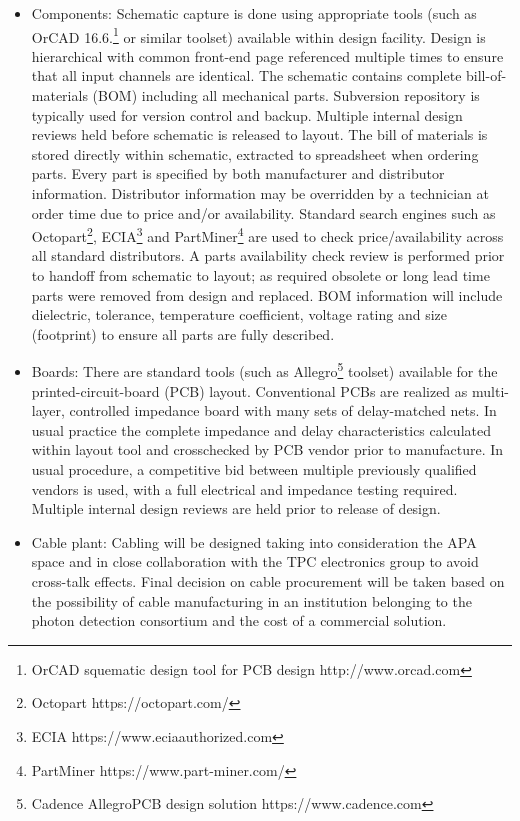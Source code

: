\begin{itemize}

\item Components: Schematic capture is done using appropriate tools (such as OrCAD 16.6.\footnote{OrCAD\texttrademark{} squematic design tool for PCB design http://www.orcad.com} or similar toolset) available within design facility. Design is hierarchical with common front-end page referenced multiple times to ensure that all input channels are identical. The schematic contains complete bill-of-materials (BOM) including all mechanical parts. Subversion repository is typically used for version control and backup. Multiple internal design reviews held before schematic is released to layout. The bill of materials is stored directly within schematic, extracted to spreadsheet when ordering parts. Every part is specified by both manufacturer and distributor information. Distributor information may be overridden by a technician at order time due to price and/or availability. Standard search engines such as Octopart\footnote{Octopart https://octopart.com/}, ECIA\footnote{ ECIA https://www.eciaauthorized.com} and PartMiner\footnote{PartMiner https://www.part-miner.com/} are used to check price/availability across all standard distributors. A parts availability check review is performed prior to handoff from schematic to layout; as required obsolete or long lead time parts were removed from design and replaced. BOM information will include dielectric, tolerance, temperature coefficient, voltage rating and size (footprint) to ensure all parts are fully described.

\item Boards: There are standard tools (such as Allegro\footnote{Cadence Allegro\textregistered PCB design solution https://www.cadence.com} toolset) available for the printed-circuit-board (PCB) layout. Conventional PCBs are realized as multi-layer, controlled impedance board with many sets of delay-matched nets. In usual practice the complete impedance and delay characteristics calculated within layout tool and crosschecked by PCB vendor prior to manufacture. In usual procedure, a competitive bid between multiple previously qualified vendors is used, with a full electrical and impedance testing required. Multiple internal design reviews are held prior to release of design.

\item Cable plant: Cabling will be designed taking into consideration the APA space and in close collaboration with the TPC electronics group to avoid cross-talk effects. Final decision on cable procurement will be taken based on the possibility of cable manufacturing in an institution belonging to the photon detection consortium and the cost of a commercial solution.  


\end{itemize}

